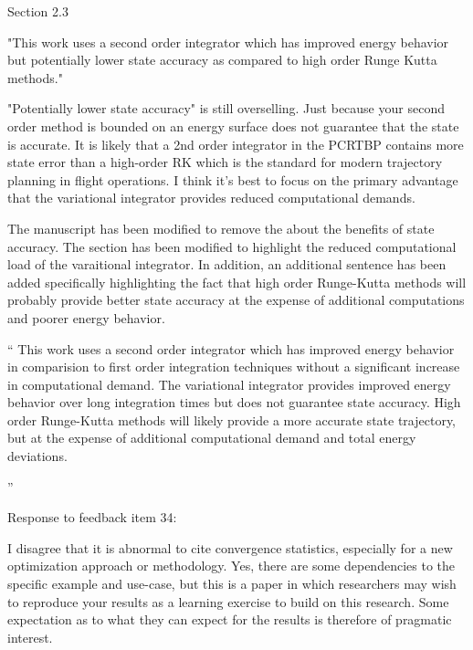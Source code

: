 \documentclass[11pt]{article}
\newenvironment{correction}{\begin{list}{}{\setlength{\leftmargin}{1cm}\setlength{\rightmargin}{1cm}}\vspace{\parsep}\item[]``}{''\end{list}}
\begin{document}
\begin{itemize}
    \item 
        \begin{itshape}
            Section 2.3

            "This work uses a second order integrator which has improved energy behavior but potentially lower state accuracy as compared to high order Runge Kutta methods."

            "Potentially lower state accuracy" is still overselling.  Just because your second order method is bounded on an energy surface does not guarantee that the state is accurate.  It is likely that a 2nd order integrator in the PCRTBP contains more state error than a high-order RK which is the standard for modern trajectory planning in flight operations.  I think it's best to focus on the primary advantage that the variational integrator provides reduced computational demands.
        \end{itshape}
    
    The manuscript has been modified to remove the about the benefits of state accuracy.
    The section has been modified to highlight the reduced computational load of the varaitional integrator.
    In addition, an additional sentence has been added specifically highlighting the fact that high order Runge-Kutta methods will probably provide better state accuracy at the expense of additional computations and poorer energy behavior.
    
    \begin{correction}
        This work uses a second order integrator which has improved energy behavior in comparision to first order integration techniques without a significant increase in computational demand.
        The variational integrator provides improved energy behavior over long integration times but does not guarantee state accuracy.
        High order Runge-Kutta methods will likely provide a more accurate state trajectory, but at the expense of additional computational demand and total energy deviations.

    \end{correction}
    \item \begin{itshape}
            Response to feedback item 34:

            I disagree that it is abnormal to cite convergence statistics, especially for a new optimization approach or methodology.  Yes, there are some dependencies to the specific example and use-case, but this is a paper in which researchers may wish to reproduce your results as a learning exercise to build on this research.  Some expectation as to what they can expect for the results is therefore of pragmatic interest.


\end{itshape}
\end{itemize}
\end{document}
